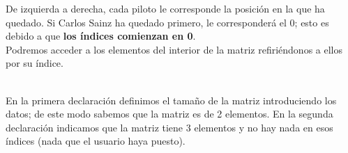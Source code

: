 \documentclass[11pt, oneside]{book}		%
\begin{document}
		De izquierda a derecha, cada piloto le corresponde la posición en la que ha quedado. Si Carlos Sainz ha quedado primero, le corresponderá el 0; esto es debido a que \textbf{los índices comienzan en 0}.\\
		Podremos acceder a los elementos del interior de la matriz refiriéndonos a ellos por su índice.
		\\\\\begin{minipage}[c]{0.95\textwidth}
			
		\end{minipage}
		En la primera declaración definimos el tamaño de la matriz introduciendo los datos; de este modo sabemos que la matriz es de 2 elementos. En la segunda declaración indicamos que la matriz tiene 3 elementos y no hay nada en esos índices (nada que el usuario haya puesto).
\end{document}
